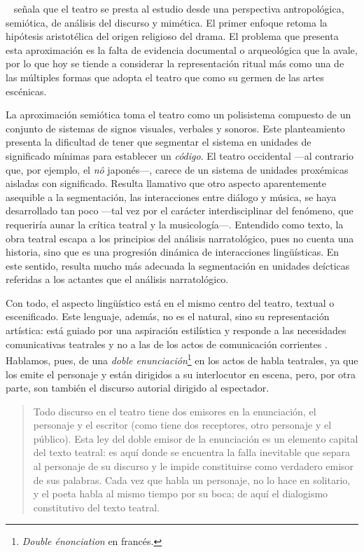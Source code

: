 \citeauthor{schaeffer1995}~\parencite*[614]{schaeffer1995} señala que el teatro se presta al estudio desde una perspectiva antropológica, semiótica, de análisis del discurso y mimética. El primer enfoque retoma la hipótesis aristotélica del origen religioso del drama. El problema que presenta esta aproximación es la falta de evidencia documental o arqueológica que la avale, por lo que hoy se tiende a considerar la representación ritual más como una de las múltiples formas que adopta el teatro que como su germen de las artes escénicas.

La aproximación semiótica \parencite[615-616]{schaeffer1995} toma el teatro como un polisistema compuesto de un conjunto de sistemas de signos visuales, verbales y sonoros. Este planteamiento presenta la dificultad de tener que segmentar el sistema en unidades de significado mínimas para establecer un \textit{código}. El teatro occidental —\nolinebreak al contrario que, por ejemplo, el \textit{nô} japonés\nolinebreak—\nolinebreak, carece de un sistema de unidades proxémicas aisladas con significado. Resulta llamativo que otro aspecto aparentemente asequible a la segmentación, las interacciones entre diálogo y música, se haya desarrollado tan poco —\nolinebreak tal vez por el carácter interdisciplinar del fenómeno, que requeriría aunar la crítica teatral y la musicología\nolinebreak—\nolinebreak. Entendido como texto, la obra teatral escapa a los principios del análisis narratológico, pues no cuenta una historia, sino que es una progresión dinámica de interacciones lingüísticas. En este sentido, resulta mucho más adecuada la segmentación en unidades deícticas referidas a los actantes que el análisis narratológico.

Con todo, el aspecto lingüístico está en el mismo centro del teatro, textual o escenificado.  Este lenguaje, además, no es el natural, sino su representación artística: está guiado por una aspiración estilística y responde a las necesidades comunicativas teatrales y no a las de los actos de comunicación corrientes \parencite[617]{schaeffer1995}. Hablamos, pues, de una \textit{doble enunciación}\footnote{\textit{Double énonciation} en francés.} en los actos de habla teatrales, ya que los emite el personaje y están dirigidos a su interlocutor en escena, pero, por otra parte, son también el discurso autorial dirigido al espectador.
\blockquote{Todo discurso en el teatro tiene dos emisores en la enunciación, el personaje y el escritor (como tiene dos receptores, otro personaje y el público).  Esta ley del doble emisor de la enunciación es un elemento capital del texto teatral: es aquí donde se encuentra la falla inevitable que separa al personaje de su discurso y le impide constituirse como verdadero emisor de sus palabras. Cada vez que habla un personaje, no lo hace en solitario, y el poeta habla al mismo tiempo por su boca; de aquí el dialogismo constitutivo del texto teatral. \parencite[p. 105; traducción propia]{ubersfeld1996}}

